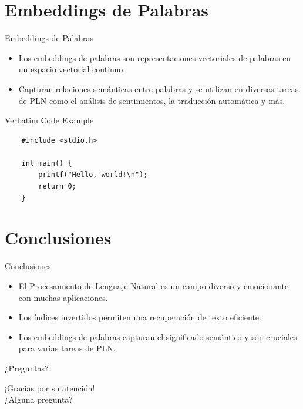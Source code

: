 \documentclass{beamer}
\begin{document}
\section{Embeddings de Palabras}

\begin{frame}{Embeddings de Palabras}
  \begin{itemize}
    \item Los embeddings de palabras son representaciones vectoriales de palabras en un espacio vectorial continuo.
    \item Capturan relaciones semánticas entre palabras y se utilizan en diversas tareas de PLN como el análisis de sentimientos, la traducción automática y más.
  \end{itemize}
\end{frame}

\begin{frame}[fragile]{Verbatim Code Example}
    \begin{verbatim}
    #include <stdio.h>

    int main() {
        printf("Hello, world!\n");
        return 0;
    }
    \end{verbatim}
\end{frame}



\section{Conclusiones}

\begin{frame}{Conclusiones}
  \begin{itemize}
    \item El Procesamiento de Lenguaje Natural es un campo diverso y emocionante con muchas aplicaciones.
    \item Los índices invertidos permiten una recuperación de texto eficiente.
    \item Los embeddings de palabras capturan el significado semántico y son cruciales para varias tareas de PLN.
  \end{itemize}
\end{frame}

\begin{frame}{¿Preguntas?}
  \begin{center}
    ¡Gracias por su atención!\\
    ¿Alguna pregunta?
  \end{center}
\end{frame}
\end{document}
